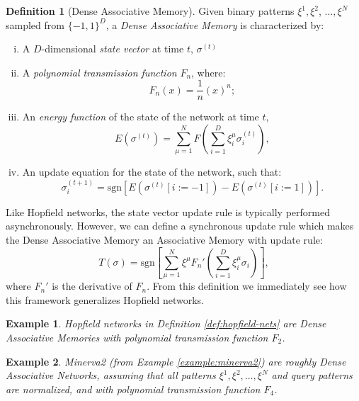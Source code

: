 \documentclass{article}
\newtheorem{example}{Example}[subsection]
\theoremstyle{definition}
\newtheorem{definition}{Definition}[subsection]
\begin{document}
\begin{definition}[Dense Associative Memory]
  Given binary patterns $\xi^1, \xi^2$, $\dots, \xi^N$ sampled from
  $\{-1, 1\}^D$,
  a \textit{Dense Associative Memory} is characterized by:
  \begin{enumerate}[(i)]
    \item A $D$-dimensional \textit{state vector} at time $t$, $\sigma^{(t)}$
    \item A \textit{polynomial transmission function} $F_n$, where:
      \begin{equation}
        F_n (x) = \frac{1}{n} (x)^n;
      \end{equation}
    \item An \textit{energy function} of the state of the network at time $t$,
      \begin{equation}
        E(\sigma^{(t)}) = \sum^N_{\mu=1} F \left( \sum^D_{i=1}
        \xi^\mu_i \sigma^{(t)}_i \right),
      \end{equation}
    \item An update equation for the state of the network, such that:
      \begin{equation}
        \sigma^{(t+1)}_i = \text{sgn} \left[ E(\sigma^{(t)}[i := -1])
        - E(\sigma^{(t)}[i := 1]) \right].
      \end{equation}
  \end{enumerate}
\end{definition}

Like Hopfield networks, the state vector update rule is typically
performed asynchronously.
However, we can define a synchronous update rule which makes the
Dense Associative
Memory an Associative Memory with update rule:
\begin{equation}
  T(\sigma) = \text{sgn} \left[\sum^N_{\mu=1} \xi^\mu F_n' \left(
  \sum^D_{i=1} \xi^\mu_i \sigma_i \right)\right],
\end{equation}
where $F_n'$ is the derivative of $F_n$. From this definition we immediately
see how this framework generalizes Hopfield networks.

\begin{example}
  Hopfield networks in Definition \ref{def:hopfield-nets} are Dense
  Associative Memories
  with polynomial transmission function $F_2$.
\end{example}

\begin{example}
  Minerva2 (from Example \ref{example:minerva2}) are roughly Dense
  Associative Networks,
  assuming that all patterns $\xi^1, \xi^2, \dots, \xi^N$ and query
  patterns are normalized,
  and with polynomial transmission function $F_4$.
\end{example}
\end{document}
